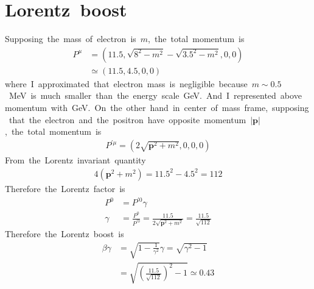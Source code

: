 \section{Lorentz\ boost}
Supposing\ the\ mass\ of\ electron\ is\ $m$,\ the\ total\ momentum\ is
\begin{align*}
    P^{\mu}&=(11.5,\sqrt{8^2-m^2}-\sqrt{3.5^2-m^2},0,0)\\
    &\simeq(11.5,4.5,0,0)
\end{align*}
where\ I\ approximated\ that\ electron\ mass\ is\ negligible\ because\ $m\sim0.5$\ MeV\ is\ much\ smaller\ than\ the\ energy\ scale\ GeV.\ And\ I\ represented\ above\ momentum\ with\ GeV.\ On\ the\ other\ hand\ in\ center\ of\ mass\ frame,\ supposing\ that\ the\ electron\ and\ the\ positron\ have\ opposite\ momentum\ $|\bm{p}|$,\ the\ total\ momentum\ is
\begin{align*}
    P^{\prime\mu}=(2\sqrt{\bm{p}^2+m^2},0,0,0)
\end{align*}
From\ the\ Lorentz\ invariant\ quantity
\begin{align*}
    4(\bm{p}^2+m^2)=11.5^2-4.5^2=112
\end{align*}
Therefore\ the\ Lorentz\ factor\ is
\begin{align*}
    P^0&=P^{\prime0}\gamma\\
    \gamma&=\frac{P^0}{P^{\prime0}}=\frac{11.5}{2\sqrt{\bm{p}^2+m^2}}=\frac{11.5}{\sqrt{112}}
\end{align*}
Therefore\ the\ Lorentz\ boost\ is
\begin{align}
    \beta\gamma&=\sqrt{1-\frac{1}{\gamma^2}}\gamma=\sqrt{\gamma^2-1}\nonumber\\
    &=\sqrt{\left(\frac{11.5}{\sqrt{112}}\right)^2-1}\simeq0.43
\end{align}
\clearpage
